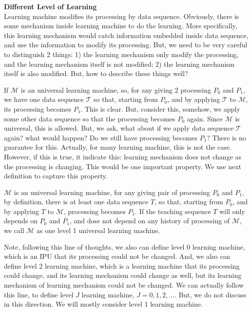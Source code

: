 {\bf Different Level of Learning } \\
Learning machine modifies its processing by data sequence. Obviously, there is some mechanism inside learning machine to do the learning. More specifically, this learning mechanism would catch information embedded inside data sequence, and use the information to modify its processing. But, we need to be very careful to distinguish 2 things: 1) the learning mechanism only modify the processing, and the learning mechanism itself is not modified; 2) the learning mechanism itself is also modified. But, how to describe these things well?

If $\mathcal{M}$ is an universal learning machine, so, for any giving 2 processing $P_0$ and $P_1$,  we have one data sequence $\mathcal{T}$ so that, starting from $P_0$, and by applying $\mathcal{T}$ to  $\mathcal{M}$, its processing becomes $P_1$. This is clear. But, consider this, somehow, we apply some other data sequence so that the processing becomes $P_0$ again. Since $\mathcal{M}$ is universal, this is allowed. But, we ask, what about if we apply data sequence $\mathcal{T}$ again? what would happen? Do we still have processing becomes $P_1$? There is no guarantee for this. Actually, for many learning machine, this is not the case. However, if this is true, it indicate this: learning mechanism does not change as the processing is changing. This would be one important property. We use next definition to capture this property. 


\begin{definition}
$\mathcal{M}$ is an universal learning machine, for any giving pair of processing $P_0$ and $P_1$, by definition, there is at least one data sequence $T$, so that, starting from $P_0$, and by applying $T$ to  $\mathcal{M}$, processing becomes $P_1$. If the teaching sequence $T$ will only depends on $P_0$ and $P_1$, and dose not depend on any history of processing of $\mathcal{M}$, we call $\mathcal{M}$ as one level 1 universal learning machine.
\end{definition}
Note, following this line of thoughts, we also can define level 0 learning machine, which is an IPU that its processing could not be changed. And, we also can define level 2 learning machine, which is a learning machine that its processing could change, and its learning mechanism could change as well, but its learning mechanism of learning mechanism could not be changed. We can actually follow this line, to define level $J$ learning machine, $J = 0,1, 2, \ldots$. But, we do not discuss in this direction. We will mostly consider level 1 learning machine. 
\bigskip







